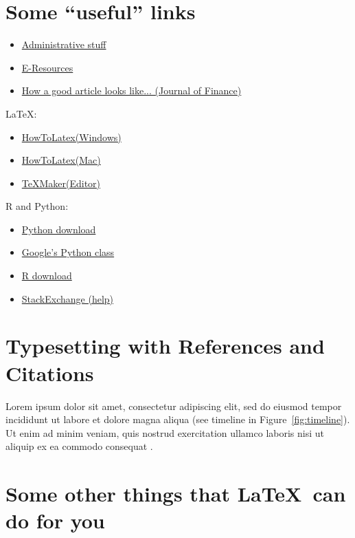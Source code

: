 \documentclass[11pt,a4paper]{article}
\begin{document}
\section{Some ``useful'' links}
\begin{itemize}
\item \href{https://pruefungsamt.wiwi.uni-halle.de/abschlussarbeiten/}{Administrative stuff}
\item \href{https://bibliothek.uni-halle.de/dbib/}{E-Resources}
\item \href{http://onlinelibrary.wiley.com/journal/10.1111/(ISSN)1540-6261}{How a good article looks like... (Journal of Finance)}
\end{itemize}
\vspace{.25cm}
\noindent \LaTeX:
\begin{itemize}
\item \href{http://tex.stackexchange.com/questions/41808/how-do-i-install-tex-latex-on-windows-7}{HowToLatex(Windows)}
\item \href{http://tex.stackexchange.com/questions/220/i-want-to-start-using-latex-on-mac-os-x-where-do-i-start}{HowToLatex(Mac)}
\item \href{http://www.xm1math.net/texmaker/}{TeXMaker(Editor)}
\end{itemize}
\vspace{.25cm}
\noindent R and Python:
\begin{itemize}
\item \href{https://www.python.org/}{Python download}
\item \href{https://developers.google.com/edu/python/}{Google's Python class}
\item \href{https://www.r-project.org/}{R download}
\item \href{http://stackexchange.com/}{StackExchange (help)}
\end{itemize}

\section{Typesetting with References and Citations}
Lorem ipsum \citet{modigliani1958cost} dolor sit amet, consectetur adipiscing elit, sed do eiusmod tempor incididunt ut labore et dolore magna aliqua (see timeline in Figure~\ref{fig:timeline}).
Ut enim ad minim veniam, quis nostrud exercitation ullamco laboris nisi ut aliquip ex ea commodo consequat \citep{bachelier1900theorie}.

\section{Some other things that \LaTeX \ can do for you}
\end{document}
